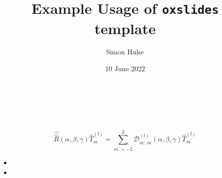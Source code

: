 \documentclass{oxslides}
\title[\texttt{oxslides Example}]{\large{Example Usage of \texttt{oxslides} template}}
\author{Simon Hulse}
\date[10/6/22]{10 June 2022}
\begin{document}
\begin{frame}
  \titlepage
\end{frame}

\begin{frame}
    \frametitle{\lipsum[1][1]}
    \framesubtitle{\lipsum[1][2]}
  \lipsum[1][3]\\
  \textbf{\lipsum[1][4]}\\
  \textit{\lipsum[1][5]}\\
  \[ \hat{\hat{R}} (\alpha, \beta, \gamma) \hat{T}_m^{(l)} = \sum_{m^{\prime} = -2}^2 \mathcal{D}_{m^{\prime}, m}^{(l)} (\alpha, \beta, \gamma) \hat{T}_{m^{\prime}}^{(l)} \]
  \begin{itemize}
      \item \lipsum[1][6]
      \item \lipsum[1][7]
  \end{itemize}
\end{frame}
\end{document}
